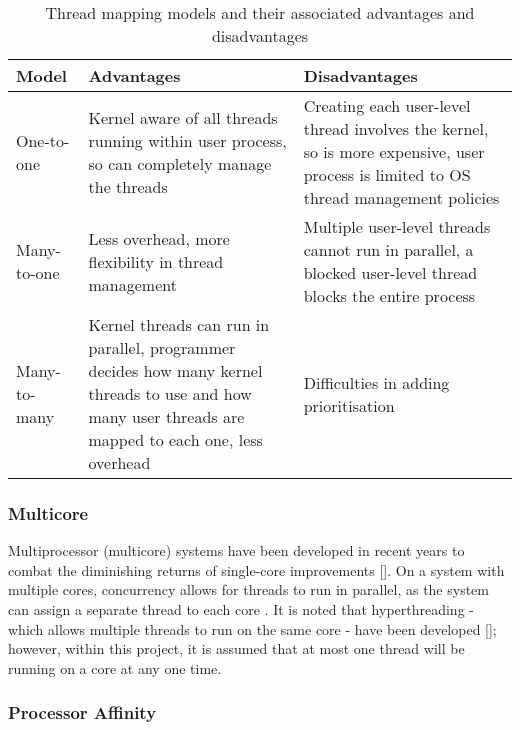 \begin{table}[H] 
    \begin{tabular}{| M{0.3\textwidth} | M{0.3\textwidth} | M{0.3\textwidth} |}
        \hline
        Model & Advantages & Disadvantages  \\ \hline
        One-to-one & Kernel aware of all threads running within user process, so can completely manage the threads & Creating each user-level thread involves the kernel, so is more expensive, user process is limited to OS thread management policies \\ \hline
        Many-to-one & Less overhead, more flexibility in thread management & Multiple user-level threads cannot run in parallel, a blocked user-level thread blocks the entire process \\ \hline
        Many-to-many & Kernel threads can run in parallel, programmer decides how many kernel threads to use and how many user threads are mapped to each one, less overhead & Difficulties in adding prioritisation \cite{brown2007c++} \\ \hline
    \end{tabular}
    \caption{Thread mapping models and their associated advantages and disadvantages}
    \label{table:thread}
\end{table}

\subsubsection{Multicore}
\label{sec:mult-core}
\noindent Multiprocessor (multicore) systems have been developed in recent years to combat the diminishing returns of single-core 
improvements []. On a system with multiple cores, concurrency allows for threads to run in parallel, as the system can assign a separate 
thread to each core \cite{os}. It is noted that hyperthreading - which allows multiple threads to run on the same core - have been 
developed []; however, within this project, it is assumed that at most one thread will be running on a core at any one time.

\subsubsection{Processor Affinity}
\label{sec:mult-pa}

